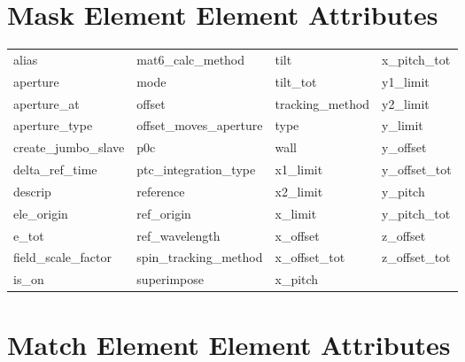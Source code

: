  \section{Mask Element Element Attributes}
 \label{s:list.mask}
 
 \begin{tabular}{llll} \toprule
alias                       & mat6_calc_method            & tilt                        & x_pitch_tot                 \\
aperture                    & mode                        & tilt_tot                    & y1_limit                    \\
aperture_at                 & offset                      & tracking_method             & y2_limit                    \\
aperture_type               & offset_moves_aperture       & type                        & y_limit                     \\
create_jumbo_slave          & p0c                         & wall                        & y_offset                    \\
delta_ref_time              & ptc_integration_type        & x1_limit                    & y_offset_tot                \\
descrip                     & reference                   & x2_limit                    & y_pitch                     \\
ele_origin                  & ref_origin                  & x_limit                     & y_pitch_tot                 \\
e_tot                       & ref_wavelength              & x_offset                    & z_offset                    \\
field_scale_factor          & spin_tracking_method        & x_offset_tot                & z_offset_tot                \\
is_on                       & superimpose                 & x_pitch                     &                             \\
 \bottomrule
 \end{tabular}
 \vfill
 
 \section{Match Element Element Attributes}
 \label{s:list.match}
 
